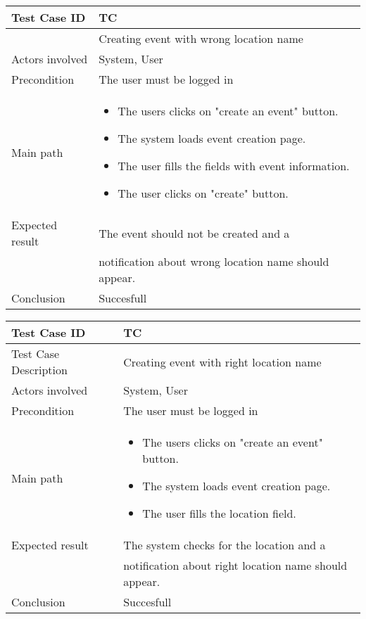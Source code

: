 \begin{center} \begin{tabular}{|l|l|}
  \hline
  Test Case ID & TC \z\\
  \hline


   & Creating event with wrong location name \\
  \hline
  Actors involved & System, User\\
   \hline
  Precondition & The user must be logged in\\
  \hline
  Main path &   \begin{minipage}{5in}
    \vskip 4pt
            \begin{itemize}
              \item The users clicks on "create an event" button.
              \item The system loads event creation page.
              \item The user fills the fields with event information.
              \item The user clicks on "create" button.
            \end{itemize}
    \vskip 4pt
  \end{minipage}  \\
  \hline
  Expected result & The event should not be created and a\\
  & notification about wrong location name should appear. \\
  \hline
  Conclusion & Succesfull\\
  \hline
\end{tabular} \end{center}


\begin{center} \begin{tabular}{|l|l|}
  \hline
  Test Case ID & TC \z\\
  \hline
  Test Case Description & Creating event with right location name \\
  \hline
  Actors involved & System, User\\
   \hline
  Precondition & The user must be logged in\\
  \hline
  Main path &   \begin{minipage}{5in}
    \vskip 4pt
            \begin{itemize}
              \item The users clicks on "create an event" button.
              \item The system loads event creation page.
              \item The user fills the location field.
            \end{itemize}
    \vskip 4pt
  \end{minipage}  \\
  \hline
  Expected result & The system checks for the location and a\\
  & notification about right location name should appear. \\
  \hline
  Conclusion & Succesfull\\
  \hline
\end{tabular} \end{center}



